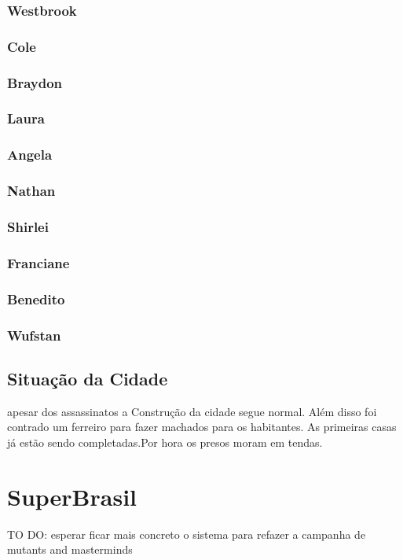 \subsection{Westbrook}
\subsection{Cole}
\subsection{Braydon}
\subsection{Laura}
\subsection{Angela}
\subsection{Nathan}
\subsection{Shirlei}
\subsection{Franciane}
\subsection{Benedito}
\subsection{Wufstan}
\section{Situação da Cidade}
apesar dos assassinatos a Construção da cidade segue normal.
Além disso foi contrado um ferreiro para fazer machados para os habitantes.
As primeiras casas já estão sendo completadas.Por hora os presos moram em tendas.
% 
% 
%
% 
\chapter{SuperBrasil}
TO DO: esperar ficar mais concreto o sistema para refazer a campanha de mutants and masterminds

